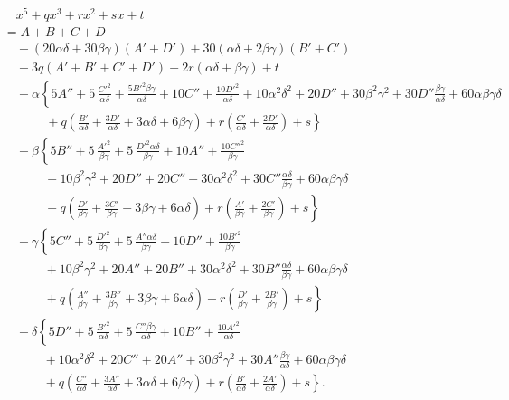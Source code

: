 \documentclass[11pt]{article}
\begin{document}
\begin{align*}
&\quad x^{5}+qx^{3}+rx^{2}+sx+t\\
&= A+B+C+D\\
&\quad +(20\alpha\delta+30\beta\gamma)(A'+D')+30(\alpha\delta+2\beta\gamma)(B'+C')\\
&\quad +3q(A'+B'+C'+D')+2r(\alpha\delta+\beta\gamma)+t\\
&\quad +\alpha\!\left\{5A''+5\,\frac{C'^{2}}{\alpha\delta}+\frac{5B'^{2}\beta\gamma}{\alpha\delta}+10C''+\frac{10D'^{2}}{\alpha\delta}
   +10\alpha^{2}\delta^{2}+20D''+30\beta^{2}\gamma^{2}+30D''\frac{\beta\gamma}{\alpha\delta}+60\alpha\beta\gamma\delta\right.\\
&\quad \left.\phantom{+\alpha\!\left\{\right.}+q\!\left(\frac{B'}{\alpha\delta}+\frac{3D'}{\alpha\delta}+3\alpha\delta+6\beta\gamma\right)
   +r\!\left(\frac{C'}{\alpha\delta}+\frac{2D'}{\alpha\delta}\right)+s\right\}\\
&\quad +\beta\!\left\{5B''+5\,\frac{A'^{2}}{\beta\gamma}+5\,\frac{D'^{2}\alpha\delta}{\beta\gamma}+10A''+\frac{10C''^{2}}{\beta\gamma}\right.\\
&\quad \phantom{+\beta\!\left\{\right.}+10\beta^{2}\gamma^{2}+20D''+20C''+30\alpha^{2}\delta^{2}+30C''\frac{\alpha\delta}{\beta\gamma}+60\alpha\beta\gamma\delta\\
&\quad \left.\phantom{+\beta\!\left\{\right.}+q\!\left(\frac{D'}{\beta\gamma}+\frac{3C'}{\beta\gamma}+3\beta\gamma+6\alpha\delta\right)
   +r\!\left(\frac{A'}{\beta\gamma}+\frac{2C'}{\beta\gamma}\right)+s\right\}\\
&\quad +\gamma\!\left\{5C''+5\,\frac{D'^{2}}{\beta\gamma}+5\,\frac{A''\alpha\delta}{\beta\gamma}+10D''+\frac{10B'^{2}}{\beta\gamma}\right.\\
&\quad \phantom{+\gamma\!\left\{\right.}+10\beta^{2}\gamma^{2}+20A''+20B''+30\alpha^{2}\delta^{2}+30B''\frac{\alpha\delta}{\beta\gamma}+60\alpha\beta\gamma\delta\\
&\quad \left.\phantom{+\gamma\!\left\{\right.}+q\!\left(\frac{A''}{\beta\gamma}+\frac{3B''}{\beta\gamma}+3\beta\gamma+6\alpha\delta\right)
   +r\!\left(\frac{D'}{\beta\gamma}+\frac{2B'}{\beta\gamma}\right)+s\right\}\\
&\quad +\delta\!\left\{5D''+5\,\frac{B'^{2}}{\alpha\delta}+5\,\frac{C''\beta\gamma}{\alpha\delta}+10B''+\frac{10A'^{2}}{\alpha\delta}\right.\\
&\quad \phantom{+\delta\!\left\{\right.}+10\alpha^{2}\delta^{2}+20C''+20A''+30\beta^{2}\gamma^{2}+30A''\frac{\beta\gamma}{\alpha\delta}+60\alpha\beta\gamma\delta\\
&\quad \left.\phantom{+\delta\!\left\{\right.}+q\!\left(\frac{C''}{\alpha\delta}+\frac{3A''}{\alpha\delta}+3\alpha\delta+6\beta\gamma\right)
   +r\!\left(\frac{B'}{\alpha\delta}+\frac{2A'}{\alpha\delta}\right)+s\right\}.
\end{align*}
\end{document}
